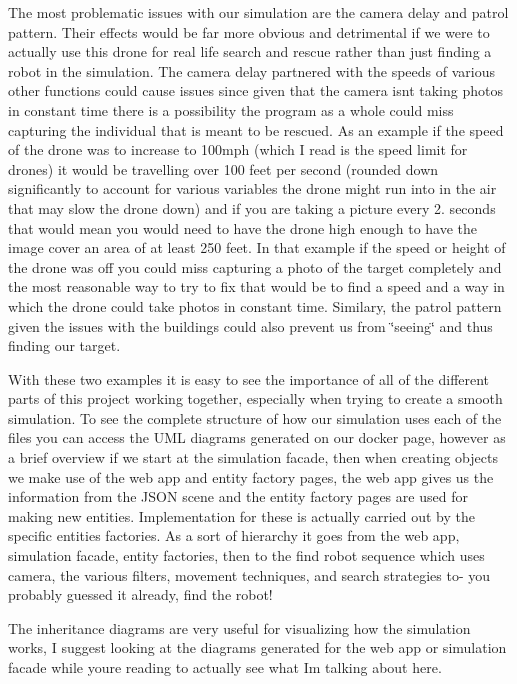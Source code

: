 The most problematic issues with our simulation are the camera delay and patrol pattern. Their effects would be far more obvious and detrimental if we were to actually use this drone for \textquotesingle{}real life\textquotesingle{} search and rescue rather than just finding a robot in the simulation. The camera delay partnered with the speeds of various other functions could cause issues since given that the camera isn\textquotesingle{}t taking photos in constant time there is a possibility the program as a whole could miss capturing the individual that is meant to be rescued. As an example if the speed of the drone was to increase to 100mph (which I read is the speed limit for drones) it would be travelling over 100 feet per second (rounded down significantly to account for various variables the drone might run into in the air that may slow the drone down) and if you are taking a picture every 2. seconds that would mean you would need to have the drone high enough to have the image cover an area of at least 250 feet. In that example if the speed or height of the drone was off you could miss capturing a photo of the target completely and the most reasonable way to try to fix that would be to find a speed and a way in which the drone could take photos in constant time. Similary, the patrol pattern given the issues with the buildings could also prevent us from \char`\"{}seeing\char`\"{} and thus finding our target.

With these two examples it is easy to see the importance of all of the different parts of this project working together, especially when trying to create a smooth simulation. To see the complete structure of how our simulation uses each of the files you can access the U\+ML diagrams generated on our docker page, however as a brief overview if we start at the simulation facade, then when creating objects we make use of the web app and entity factory pages, the web app gives us the information from the J\+S\+ON scene and the entity factory pages are used for making new entities. Implementation for these is actually carried out by the specific entities factories. As a sort of hierarchy it goes from the web app, simulation facade, entity factories, then to the find robot sequence which uses camera, the various filters, movement techniques, and search strategies to-\/ you probably guessed it already, find the robot!

The inheritance diagrams are very useful for visualizing how the simulation works, I suggest looking at the diagrams generated for the web app or simulation facade while you\textquotesingle{}re reading to actually see what I\textquotesingle{}m talking about here. 